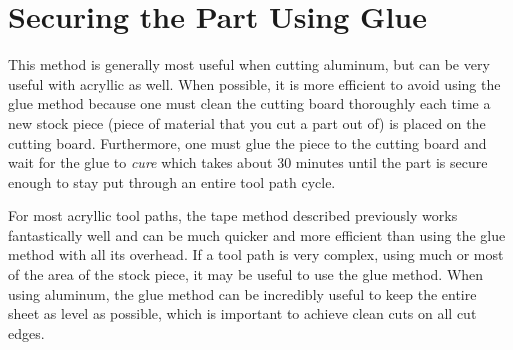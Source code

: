 \documentclass{article}
\begin{document}
\section{Securing the Part Using Glue}
This method is generally most useful when cutting aluminum, but can be very useful with acryllic as well. When possible, it is more efficient to avoid 
using the glue method because one must clean the cutting board thoroughly each time a new stock piece (piece of material that you cut a part out of) is 
placed on the cutting board. Furthermore, one must glue the piece to the cutting board and wait for the glue to \textit{cure} which takes about 30
minutes until the part is secure enough to stay put through an entire tool path cycle.

For most acryllic tool paths, the tape method described previously works fantastically well and can be much quicker and more efficient than using the 
glue method with all its overhead. If a tool path is very complex, using much or most of the area of the stock piece, it may be useful to use the glue
method. When using aluminum, the glue method can be incredibly useful to keep the entire sheet as level as possible, which is important to achieve 
clean cuts on all cut edges.
\end{document}
